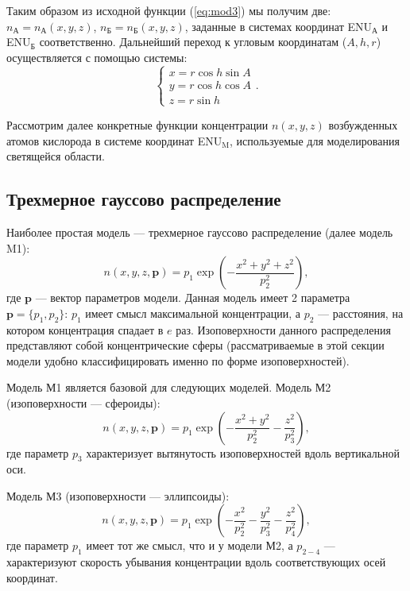 \documentclass[12pt,a4paper]{article}
\renewcommand{\vec}{\mathbf}
\begin{document}
Таким образом из исходной функции (\ref{eq:mod3}) мы получим две: $n_\text{А}=n_\text{А}(x,y,z)$, $n_\text{Б}=n_\text{Б}(x,y,z)$, заданные в системах координат ENU$_\text{А}$ и ENU$_\text{Б}$ соответственно. Дальнейший переход к угловым координатам ($A,h,r$) осуществляется с помощью системы:
\begin{equation}\label{eq:mod8}
\begin{cases}
x = r\cos{h}\sin{A} \\
y = r\cos{h}\cos{A} \\
z = r\sin{h}
\end{cases}.
\end{equation}

Рассмотрим далее конкретные функции концентрации $n(x,y,z)$ возбужденных атомов кислорода в системе координат ENU$_\text{M}$, используемые для моделирования светящейся области.

\subsection{Трехмерное гауссово распределение} \label{subsec:model1}

Наиболее простая модель --- трехмерное гауссово распределение (далее модель M1):
\begin{equation}\label{eq:gauss1}
n(x,y,z,\vec{p})=p_1 \exp{(-\frac{x^2+y^2+z^2}{p_2^2})},
\end{equation}
где $\vec{p}$ --- вектор параметров модели. Данная модель имеет 2 параметра $\vec{p}=\{p_1,p_2\}$: $p_1$ имеет смысл максимальной концентрации, а $p_2$ --- расстояния, на котором концентрация спадает в $e$ раз. Изоповерхности данного распределения представляют собой концентрические сферы (рассматриваемые в этой секции модели удобно классифицировать именно по форме изоповерхностей). 

Модель М1 является базовой для следующих моделей. Модель М2 (изоповерхности --- сфероиды):
\begin{equation}\label{eq:gauss2}
	n(x,y,z,\vec{p})=p_1 \exp{(-\frac{x^2+y^2}{p_2^2}-\frac{z^2}{p_3^2})},
\end{equation}
где параметр $p_3$ характеризует вытянутость изоповерхностей вдоль вертикальной оси.

Модель М3 (изоповерхности --- эллипсоиды):
\begin{equation}\label{eq:gauss3}
n(x,y,z,\vec{p})=p_1 \exp{(-\frac{x^2}{p_2^2}-\frac{y^2}{p_3^2}-\frac{z^2}{p_4^2})},
\end{equation}
где параметр $p_{1}$ имеет тот же смысл, что и у модели М2, а $p_{2-4}$ --- 
характеризуют скорость убывания концентрации вдоль соответствующих осей координат.
\end{document}
